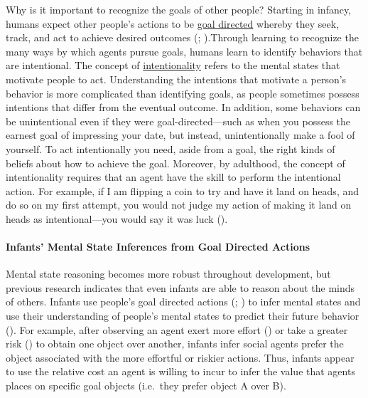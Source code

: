 \documentclass[
]{krantz}
\begin{document}
Why is it important to recognize the goals of other people? Starting in infancy, humans expect other people's actions to be \hyperref[goal-directed]{goal directed} whereby they seek, track, and act to achieve desired outcomes (; ).Through learning to recognize the many ways by which agents pursue goals, humans learn to identify behaviors that are intentional. The concept of \hyperref[intentionality]{intentionality} refers to the mental states that motivate people to act. Understanding the intentions that motivate a person's behavior is more complicated than identifying goals, as people sometimes possess intentions that differ from the eventual outcome. In addition, some behaviors can be unintentional even if they were goal-directed---such as when you possess the earnest goal of impressing your date, but instead, unintentionally make a fool of yourself. To act intentionally you need, aside from a goal, the right kinds of beliefs about how to achieve the goal. Moreover, by adulthood, the concept of intentionality requires that an agent have the skill to perform the intentional action. For example, if I am flipping a coin to try and have it land on heads, and do so on my first attempt, you would not judge my action of making it land on heads as intentional---you would say it was luck ().

\paragraph*{Infants' Mental State Inferences from Goal Directed Actions}\label{infants-mental-state-inferences-from-goal-directed-actions}

Mental state reasoning becomes more robust throughout development, but previous research indicates that even infants are able to reason about the minds of others. Infants use people's goal directed actions (; ) to infer mental states and use their understanding of people's mental states to predict their future behavior (). For example, after observing an agent exert more effort () or take a greater risk () to obtain one object over another, infants infer social agents prefer the object associated with the more effortful or riskier actions. Thus, infants appear to use the relative cost an agent is willing to incur to infer the value that agents places on specific goal objects (i.e.~they prefer object A over B).
\end{document}
